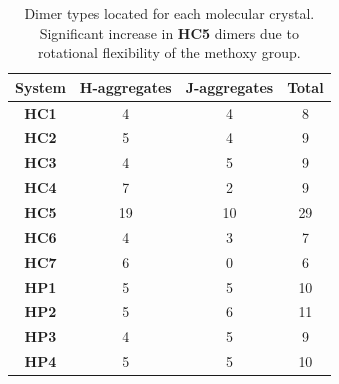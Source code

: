 \begin{table}
\centering
\caption[Dimer types for \textbf{HC} and \textbf{HP} molecular crystals]{Dimer types located for each molecular crystal. Significant increase in \textbf{HC5} dimers due to rotational flexibility of the methoxy group.} 
  \label{table: dimer_types}
  \begin{tabular}{cccc}
  \hline
  System & H-aggregates & J-aggregates & Total\\
  \hline
  \textbf{HC1} & 4 & 4 & 8\\
  \textbf{HC2} & 5 & 4 & 9 \\
  \textbf{HC3} & 4 & 5 & 9\\
  \textbf{HC4} & 7 & 2 & 9\\
  \textbf{HC5} & 19 & 10 & 29 \\
  \textbf{HC6} & 4 & 3 & 7\\
  \textbf{HC7} & 6 & 0 & 6\\
  \hline
  \textbf{HP1} & 5 & 5 & 10\\
  \textbf{HP2} & 5 & 6 & 11\\
  \textbf{HP3} & 4 & 5 & 9\\
  \textbf{HP4} & 5 & 5 & 10\\
  \hline
  \end{tabular}
\end{table}


